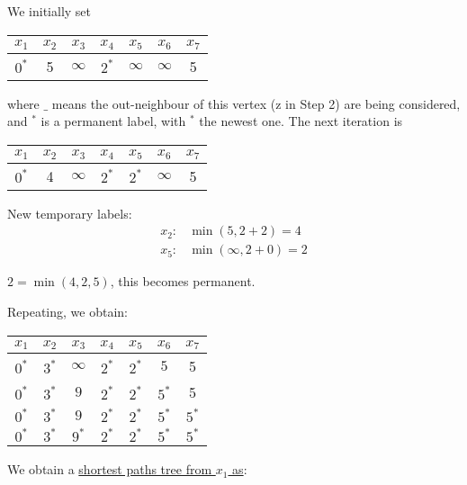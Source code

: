 We initially set 
\begin{table}[H]
    \centering
    \begin{tabular}{|ccccccc|}
    \hline
       $x_1$ & $x_2$ & $x_3$ & $x_4$ & $x_5$ & $x_6$ & $x_7$   \\ \hline
    \uline{$0^*$} & 5 & $\infty$ & $2^{\boxed{*}}$ & $\infty$ & $\infty$ & 5 \\ \hline
    \end{tabular}
\end{table}
where $\_$ means the out-neighbour of this vertex (z in Step 2) are being considered, and ${}^*$ is a permanent label, with $^{\boxed{*}}$ the newest one. The next iteration is 
\begin{table}[H]
    \centering
    \begin{tabular}{|ccccccc|}
    \hline
       $x_1$ & $x_2$ & $x_3$ & $x_4$ & $x_5$ & $x_6$ & $x_7$   \\ \hline
    $0^*$ & 4 & $\infty$ & \uline{$2^*$} & $2^{\boxed{*}}$ & $\infty$ & 5 \\ \hline
    \end{tabular}
\end{table}

New temporary labels:
\begin{align*}
    x_2: & \min(5, 2+2) = 4\\
    x_5: & \min(\infty, 2+0) = 2
\end{align*}

$2 = \min(4, 2, 5)$, this becomes permanent.

Repeating, we obtain:
\begin{table}[H]
    \centering
    \begin{tabular}{|ccccccc|}
    \hline
       $x_1$ & $x_2$ & $x_3$ & $x_4$ & $x_5$ & $x_6$ & $x_7$   \\ \hline
    $0^*$ & $3^{\boxed{*}}$ & $\infty$ & $2^*$ & \uline{$2^*$} & $5$ & 5 \\
    $0^*$ & \uline{$3^*$} & $9$ & $2^*$ & $2^*$ & $5^{\boxed{*}}$ & 5 \\
    $0^*$ & $3^*$ & $9$ & $2^*$ & $2^*$ & \uline{$5^*$} & $5^{\boxed{*}}$ \\
    $0^*$ & $3^*$ & $9^{\boxed{*}}$ & $2^*$ & $2^*$ & $5^*$ & \uline{$5^{*}$} \\
    \hline
    \end{tabular}
\end{table}

We obtain a \uline{shortest paths tree from $x_1$ as}:

